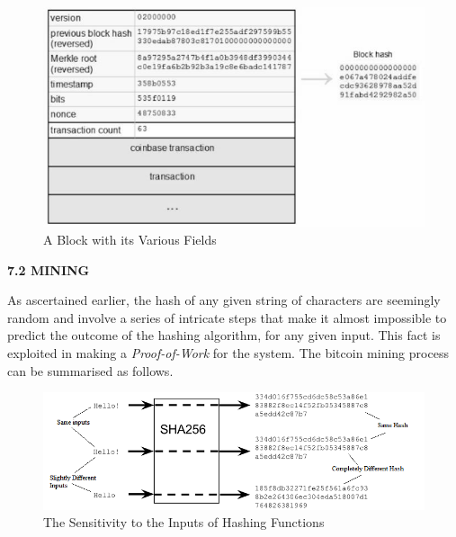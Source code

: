\documentclass[12pt,a4paper]{report}
\begin{document}
\begin{justify}
\vspace{10mm}
\begin{figure}[h]
\centering
\caption{A Block with its Various Fields\cite{field}}
\includegraphics[scale=0.7]{pics/blk.JPG}
\end{figure}
\vspace{10mm}



\vspace{10mm}
\newpage

\vspace{10mm}
\textbf{7.2 MINING}
\vspace{10mm}

As ascertained earlier, the hash of any given string of characters are seemingly random and involve a series of intricate steps that make it almost impossible to predict the outcome of the hashing algorithm, for any given input. This fact is exploited in making a \textit{Proof-of-Work} for the system. The bitcoin mining process can be summarised as follows.


\vspace{10mm}
\begin{figure}[h]
\centering
\caption{The Sensitivity to the Inputs of Hashing Functions \cite{prop}}
\includegraphics[scale=0.7]{pics/BlockOverviewSHA.png}
\end{figure}
\vspace{10mm}


\end{justify}
\end{document}
